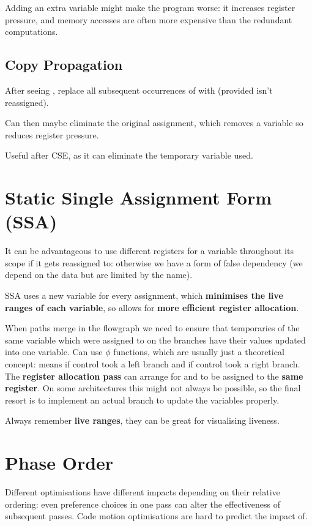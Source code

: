 \documentclass[a4paper, 11pt]{article}
\begin{document}
{{        Adding an extra variable might make the program worse: it increases register pressure, and memory accesses are often more expensive than the redundant computations.
    }
    \subsection*{Copy Propagation}
    {
        After seeing , replace all subsequent occurrences of  with  (provided  isn't reassigned).

        Can then maybe eliminate the original assignment, which removes a variable so reduces register pressure.

        Useful after CSE, as it can eliminate the temporary variable used.
    }
}
\section*{Static Single Assignment Form (SSA)}
{
    It can be advantageous to use different registers for a variable throughout its scope if it gets reassigned to: otherwise we have a form of false dependency (we depend on the data but are limited by the name).

    SSA uses a new variable for every assignment, which \textbf{minimises the live ranges of each variable}, so allows for \textbf{more efficient register allocation}.

    When paths merge in the flowgraph we need to ensure that temporaries of the same variable which were assigned to on the branches have their values updated into one variable. Can use \(\phi\) functions, which are usually just a theoretical concept:  means  if control took a left branch and  if control took a right branch. The \textbf{register allocation pass} can arrange for  and  to be assigned to the \textbf{same register}. On some architectures this might not always be possible, so the final resort is to implement an actual branch to update the variables properly.

    Always remember \textbf{live ranges}, they can be great for visualising liveness.
}
\section*{Phase Order}
{
    Different optimisations have different impacts depending on their relative ordering: even preference choices in one pass can alter the effectiveness of subsequent passes. Code motion optimisations are hard to predict the impact of.
}
\end{document}
